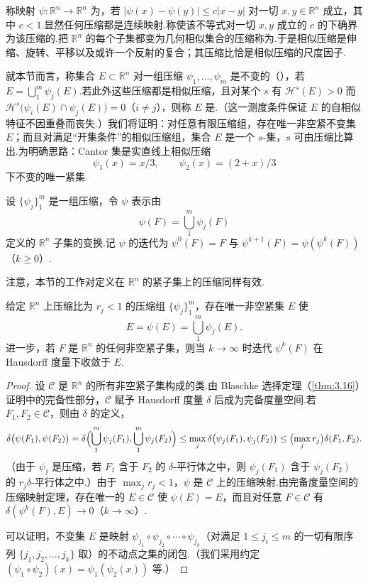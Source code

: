 称映射 $\psi:\mathbb{R}^n\to\mathbb{R}^n$ 为，若 $|\psi(x)-\psi(y)|\leq c|x-y|$ 对一切 $x,y\in\mathbb{R}^n$ 成立，其中 $c<1$.显然任何压缩都是连续映射.称使该不等式对一切 $x,y$ 成立的 $c$ 的下确界为该压缩的.把 $\mathbb{R}^n$ 的每个子集都变为几何相似集合的压缩称为.于是相似压缩是伸缩、旋转、平移以及或许一个反射的复合；其压缩比恰是相似压缩的尺度因子.

就本节而言，称集合 $E\subset\mathbb{R}^n$ 对一组压缩 $\psi_1,\ldots,\psi_m$ 是不变的（），若 $E=\bigcup_{1}^{m}\psi_j(E)$.若此外这些压缩都是相似压缩，且对某个 $s$ 有 $\mathcal{H}^s(E)>0$ 而 $\mathcal{H}^s\bigl(\psi_i(E)\cap\psi_j(E)\bigr)=0$（$i\neq j$），则称 $E$ 是.（这一测度条件保证 $E$ 的自相似特征不因重叠而丧失.）我们将证明：对任意有限压缩组，存在唯一非空紧不变集 $E$；而且对满足``开集条件''的相似压缩组，集合 $E$ 是一个 $s$-集，$s$ 可由压缩比算出.为明确思路：Cantor 集是实直线上相似压缩
\[
  \psi_1(x)=x/3,\qquad \psi_2(x)=(2+x)/3
\]
下不变的唯一紧集.

设 $\{\psi_j\}_{1}^{m}$ 是一组压缩，令 $\psi$ 表示由
\[
  \psi(F)=\bigcup_{1}^{m}\psi_j(F)
\]
定义的 $\mathbb{R}^n$ 子集的变换.记 $\psi$ 的迭代为 $\psi^0(F)=F$ 与 $\psi^{k+1}(F)=\psi(\psi^k(F))$（$k\geq 0$）.

注意，本节的工作对定义在 $\mathbb{R}^n$ 的紧子集上的压缩同样有效.

\begin{theorem}\label{thm:8.3}
给定 $\mathbb{R}^n$ 上压缩比为 $r_j<1$ 的压缩组 $\{\psi_j\}_{1}^{m}$，存在唯一非空紧集 $E$ 使
\begin{equation}\label{eq:8.13}
  E=\psi(E)=\bigcup_{1}^{m}\psi_j(E).
\end{equation}
进一步，若 $F$ 是 $\mathbb{R}^n$ 的任何非空紧子集，则当 $k\to\infty$ 时迭代 $\psi^k(F)$ 在 Hausdorff 度量下收敛于 $E$.
\end{theorem}

\begin{proof}
设 $\mathcal{C}$ 是 $\mathbb{R}^n$ 的所有非空紧子集构成的类.由 Blaschke 选择定理（\cref{thm:3.16}）证明中的完备性部分，$\mathcal{C}$ 赋予 Hausdorff 度量 $\delta$ 后成为完备度量空间.若 $F_1,F_2\in\mathcal{C}$，则由 $\delta$ 的定义，
\[
  \delta\bigl(\psi(F_1),\psi(F_2)\bigr)
  =\delta\Bigl(\bigcup_{1}^{m}\psi_j(F_1),\bigcup_{1}^{m}\psi_j(F_2)\Bigr)
  \leq\max_{j}\delta\bigl(\psi_j(F_1),\psi_j(F_2)\bigr)
  \leq\bigl(\max_{j}r_j\bigr)\delta(F_1,F_2).
\]
（由于 $\psi_j$ 是压缩，若 $F_1$ 含于 $F_2$ 的 $\delta$-平行体之中，则 $\psi_j(F_1)$ 含于 $\psi_j(F_2)$ 的 $r_j\delta$-平行体之中.）由于 $\max_j r_j<1$，$\psi$ 是 $\mathcal{C}$ 上的压缩映射.由完备度量空间的压缩映射定理，存在唯一的 $E\in\mathcal{C}$ 使 $\psi(E)=E$，而且对任意 $F\in\mathcal{C}$ 有 $\delta(\psi^k(F),E)\to 0$（$k\to\infty$）.

可以证明，不变集 $E$ 是映射 $\psi_{j_1}\circ\psi_{j_2}\circ\cdots\circ\psi_{j_k}$（对满足 $1\leq j_i\leq m$ 的一切有限序列 $\{j_1,j_2,\ldots,j_k\}$ 取）的不动点之集的闭包.（我们采用约定 $(\psi_1\circ\psi_2)(x)=\psi_1(\psi_2(x))$ 等.）
\end{proof}

